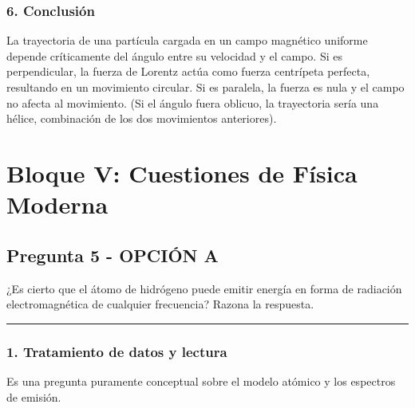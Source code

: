 \subsubsection*{6. Conclusión}
\begin{cajaconclusion}
La trayectoria de una partícula cargada en un campo magnético uniforme depende críticamente del ángulo entre su velocidad y el campo. Si es perpendicular, la fuerza de Lorentz actúa como fuerza centrípeta perfecta, resultando en un movimiento circular. Si es paralela, la fuerza es nula y el campo no afecta al movimiento. (Si el ángulo fuera oblicuo, la trayectoria sería una hélice, combinación de los dos movimientos anteriores).
\end{cajaconclusion}

\newpage

\section{Bloque V: Cuestiones de Física Moderna}
\label{sec:moderna_2002_sep_ext}

\subsection{Pregunta 5 - OPCIÓN A}
\label{subsec:5A_2002_sep_ext}

\begin{cajaenunciado}
¿Es cierto que el átomo de hidrógeno puede emitir energía en forma de radiación electromagnética de cualquier frecuencia? Razona la respuesta.
\end{cajaenunciado}
\hrule

\subsubsection*{1. Tratamiento de datos y lectura}
Es una pregunta puramente conceptual sobre el modelo atómico y los espectros de emisión.

